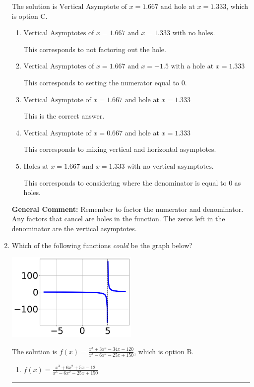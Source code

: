 \documentclass{extbook}[14pt]
\newcommand{\litem}[1]{\item #1

\rule{\textwidth}{0.4pt}}
\begin{document}
\begin{enumerate}
{The solution is \( \text{Vertical Asymptote of } x = 1.667 \text{ and hole at } x = 1.333 \), which is option C.\begin{enumerate}[label=\Alph*.]
\item \( \text{Vertical Asymptotes of } x = 1.667 \text{ and } x = 1.333 \text{ with no holes.} \)

This corresponds to not factoring out the hole.
\item \( \text{Vertical Asymptotes of } x = 1.667 \text{ and } x = -1.5 \text{ with a hole at } x = 1.333 \)

This corresponds to setting the numerator equal to 0.
\item \( \text{Vertical Asymptote of } x = 1.667 \text{ and hole at } x = 1.333 \)

This is the correct answer.
\item \( \text{Vertical Asymptote of } x = 0.667 \text{ and hole at } x = 1.333 \)

This corresponds to mixing vertical and horizontal asymptotes.
\item \( \text{Holes at } x = 1.667 \text{ and } x = 1.333 \text{ with no vertical asymptotes.} \)

This corresponds to considering where the denominator is equal to 0 as holes.
\end{enumerate}

\textbf{General Comment:} Remember to factor the numerator and denominator. Any factors that cancel are holes in the function. The zeros left in the denominator are the vertical asymptotes.
}
\litem{
Which of the following functions \textit{could} be the graph below?

\begin{center}
    \includegraphics[width=0.5\textwidth]{../Figures/identifyGraphOfRationalFunctionC.png}
\end{center}




The solution is \( f(x)=\frac{x^{3} +3 x^{2} -34 x -120}{x^{3} -6 x^{2} -25 x + 150} \), which is option B.\begin{enumerate}[label=\Alph*.]
\item \( f(x)=\frac{x^{3} +6 x^{2} +5 x -12}{x^{3} -6 x^{2} -25 x + 150} \)


\end{enumerate}}
\end{enumerate}
\end{document}
